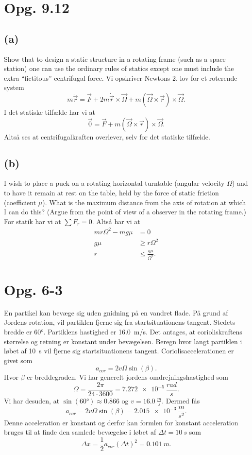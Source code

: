 \documentclass[12pt]{article}
\theoremstyle{definition}
\begin{document}
\section*{Opg. 9.12}

\subsection*{(a)}
Show that to design a static structure in a rotating frame (such as a space station) one can use the ordinary rules of statics except one must include the extra ``fictitous'' centrifugal force. 
\bigbreak
Vi opskriver Newtons 2. lov for et roterende system
\[ 
m \ddot{\Vec{r}} = \Vec{F} + 2m \dot{\Vec{r}} \times \Vec{\Omega} + m(\Vec{\Omega} \times \Vec{r}) \times \Vec{\Omega}
.\]
I det statiske tilfælde har vi at
\[ 
\Vec{0} = \Vec{F} + m (\Vec{\Omega} \times \Vec{r}) \times \Vec{\Omega}
.\]
Altså ses at centrifugalkraften overlever, selv for det statiske tilfælde.


\subsection*{(b)}
I wish to place a puck on a rotating horizontal turntable (angular velocity $\Omega$) and to have it remain at rest on the table, held by the force of static friction (coefficient $\mu$). What is the maximum distance from the axis of rotation at which I can do this? (Argue from the point of view of a observer in the rotating frame.)
\bigbreak
For statik har vi at $\sum F_r = 0$. Altså har vi at
\begin{align*}
  mr \Omega^2 - mg\mu &= 0 \\
  g\mu &\geq r\Omega^2 \\
  r &\leq \frac{g\mu}{\Omega^2}
.\end{align*}


\section*{Opg. 6-3}
En partikel kan bevæge sig uden gnidning på en vandret flade. På grund af Jordens rotation, vil partiklen fjerne sig fra startsituationens tangent. Stedets bredde er \ang{60}. Partiklens hastighed er \qty{16,0}{m/s}. Det antages, at corioliskraftens størrelse og retning er konstant under bevægelsen. Beregn hvor langt partiklen i løbet af \qty{10}{s} vil fjerne sig startsituationens tangent.
\bigbreak
Coriolisaccelerationen er givet som
\[ 
a_{cor} = 2v \Omega \sin(\beta)
.\]
Hvor $\beta$ er breddegraden. Vi har generelt jordens omdrejningshastighed som
\[ 
\Omega = \frac{2\pi}{24 \cdot 3600} = \qty{7,272e-5}{\frac{rad}{s}}
.\]
Vi har desuden, at $\sin(\ang{60}) \approx \num{0,866}$ og $v = \qty{16,0}{\frac{m}{s}}$. Dermed fås
\[ 
a_{cor} = 2v \Omega \sin(\beta) = \qty{2,015e-3}{\frac{m}{s^2}} 
.\]
Denne acceleration er konstant og derfor kan formlen for konstant acceleration bruges til at finde den samlede bevægelse i løbet af $\Delta t = \qty{10}{s}$ som
\[ 
\Delta x = \frac{1}{2}a_{cor}(\Delta t)^2 = \qty{0,101}{m}
.\]
\end{document}
